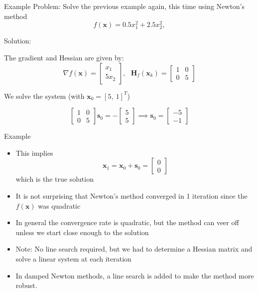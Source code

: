 \documentclass[xcolor=dvipsnames,11pt]{beamer}
\newcommand{\highlight}[1]{\textcolor{BrickRed}{#1}}
\begin{document}
\begin{frame}{Example}
	\highlight{Problem}: Solve the previous example again, this time using Newton's method
	$$f(\mathbf{x}) = 0.5 x_1^2 + 2.5 x_2^2,$$
	
	
	\highlight{Solution}:
	
	The gradient and Hessian are given by:
	$$\nabla f(\mathbf{x}) = \begin{bmatrix} x_1 \\ 5x_2 \end{bmatrix}, ~~~\mathbf{H}_f(\mathbf{x}_k) = \begin{bmatrix} 1 & 0 \\ 0 & 5 \end{bmatrix}$$
	
	
	We solve the system (with $\mathbf{x}_0 = [5,~1]^T$)
	
	$$\begin{bmatrix} 1 & 0 \\ 0 & 5 \end{bmatrix} \mathbf{s}_0 = - \begin{bmatrix} 5 \\ 5 \end{bmatrix} \implies \mathbf{s}_0 = \begin{bmatrix} -5 \\ -1\end{bmatrix}$$
	
\end{frame}


\begin{frame}{Example}
	\begin{itemize}
		\item This implies $$\mathbf{x}_1 = \mathbf{x}_0 + \mathbf{s}_0 = \begin{bmatrix}
		0 \\ 0 \end{bmatrix}$$which is the true solution
		\item It is not surprising that Newton's method converged in 1 iteration since the $f(\mathbf{x})$ was quadratic
		\item In general the convergence rate is quadratic, but the method can veer off unless we start close enough to the solution
		\item Note: No line search required, but we had to determine a Hessian matrix and solve a linear system at each iteration
		\item In damped Newton methods, a line search is added to make the method more robust.
	\end{itemize}
\end{frame}
\end{document}
